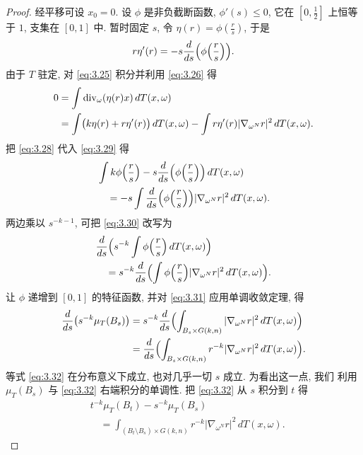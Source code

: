 \begin{proof}
经平移可设 $x_0=0$. 设 $\phi$ 是非负截断函数, $\phi'(s)\leq0$, 它在
$[0,\frac12]$ 上恒等于 $1$, 支集在 $[0,1]$ 中. 暂时固定 $s$, 令
$\eta(r)=\phi(\frac rs)$, 于是
\begin{equation}
r\eta'(r)=-s\frac{d}{ds}\Bigl(\phi\Bigl(\frac rs\Bigr)\Bigr).
\label{eq:3.28}
\end{equation}
由于 $T$ 驻定, 对 \eqref{eq:3.25} 积分并利用 \eqref{eq:3.26} 得
\begin{equation}
\begin{aligned}
0&=\int\operatorname{div}_\omega(\eta(r)x)\,dT(x,\omega)\\
&=\int\bigl(k\eta(r)+r\eta'(r)\bigr)\,dT(x,\omega)
 -\int r\eta'(r)|\nabla_{\omega^N}r|^2\,dT(x,\omega).
\end{aligned}
\label{eq:3.29}
\end{equation}
把 \eqref{eq:3.28} 代入 \eqref{eq:3.29} 得
\begin{equation}
\begin{aligned}
&\int k\phi\Bigl(\frac rs\Bigr)-s\frac{d}{ds}
 \Bigl(\phi\Bigl(\frac rs\Bigr)\Bigr)\,dT(x,\omega)\\
&\quad=-s\int\frac{d}{ds}\Bigl(\phi\Bigl(\frac rs\Bigr)\Bigr)
 |\nabla_{\omega^N}r|^2\,dT(x,\omega).
\end{aligned}
\label{eq:3.30}
\end{equation}
两边乘以 $s^{-k-1}$, 可把 \eqref{eq:3.30} 改写为
\begin{equation}
\begin{aligned}
&\frac{d}{ds}\Bigl(s^{-k}\int\phi\Bigl(\frac rs\Bigr)\,dT(x,\omega)\Bigr)\\
&\quad=s^{-k}\frac{d}{ds}
 \Bigl(\int\phi\Bigl(\frac rs\Bigr)|\nabla_{\omega^N}r|^2
 \,dT(x,\omega)\Bigr).
\end{aligned}
\label{eq:3.31}
\end{equation}
让 $\phi$ 递增到 $[0,1]$ 的特征函数, 并对 \eqref{eq:3.31} 应用单调收敛定理, 得
\begin{equation}
\begin{aligned}
\frac{d}{ds}\bigl(s^{-k}\mu_T(B_s)\bigr)
&=s^{-k}\frac{d}{ds}
 \Bigl(\int_{B_s\times G(k,n)}|\nabla_{\omega^N}r|^2\,dT(x,\omega)\Bigr)\\
&=\frac{d}{ds}\Bigl(\int_{B_s\times G(k,n)}
 r^{-k}|\nabla_{\omega^N}r|^2\,dT(x,\omega)\Bigr).
\end{aligned}
\label{eq:3.32}
\end{equation}
等式 \eqref{eq:3.32} 在分布意义下成立, 也对几乎一切 $s$ 成立. 为看出这一点, 我们
利用 $\mu_T(B_s)$ 与 \eqref{eq:3.32} 右端积分的单调性. 把 \eqref{eq:3.32} 从 $s$ 积分到
$t$ 得
\begin{equation}
\begin{aligned}
&t^{-k}\mu_T(B_t)-s^{-k}\mu_T(B_s)\\
&\quad=\int_{(B_t\setminus B_s)\times G(k,n)}
 r^{-k}|\nabla_{\omega^N}r|^2\,dT(x,\omega).
\end{aligned}
\label{eq:3.33}
\end{equation}
\end{proof}

